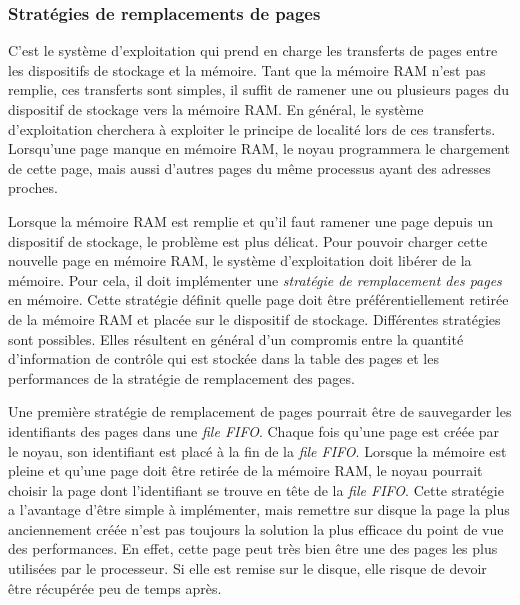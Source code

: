\subsubsection{Stratégies de remplacements de pages}

C'est le système d'exploitation qui prend en charge les transferts de
pages entre les dispositifs de stockage et la mémoire. Tant que la
mémoire RAM n'est pas remplie, ces transferts sont simples, il suffit
de ramener une ou plusieurs pages du dispositif de stockage vers la
mémoire RAM. En général, le système d'exploitation cherchera à
exploiter le principe de localité lors de ces transferts. Lorsqu'une
page manque en mémoire RAM, le noyau programmera le chargement de
cette page, mais aussi d'autres pages du même processus ayant des
adresses proches.\newline
   
Lorsque la mémoire RAM est remplie et qu'il faut ramener une page
depuis un dispositif de stockage, le problème est plus délicat. Pour
pouvoir charger cette nouvelle page en mémoire RAM, le système
d'exploitation doit libérer de la mémoire. Pour cela, il doit
implémenter une \textit{stratégie de remplacement des pages} en
mémoire. Cette stratégie définit quelle page doit être
préférentiellement retirée de la mémoire RAM et placée sur le
dispositif de stockage. Différentes stratégies sont possibles. Elles
résultent en général d'un compromis entre la quantité d'information
de contrôle qui est stockée dans la table des pages et les
performances de la stratégie de remplacement des pages. \newline
   
Une première stratégie de remplacement de pages pourrait être de
sauvegarder les identifiants des pages dans une \textit{file FIFO}.
Chaque fois qu'une page est créée par le noyau, son identifiant est
placé à la fin de la \textit{file FIFO}. Lorsque la mémoire est pleine
et qu'une page doit être retirée de la mémoire RAM, le noyau pourrait
choisir la page dont l'identifiant se trouve en tête de la \textit{file
FIFO}. Cette stratégie a l'avantage d'être simple à implémenter, mais
remettre sur disque la page la plus anciennement créée n'est pas
toujours la solution la plus efficace du point de vue des performances.
En effet, cette page peut très bien être une des pages les plus
utilisées par le processeur. Si elle est remise sur le disque, elle
risque de devoir être récupérée peu de temps après.\newline
   

